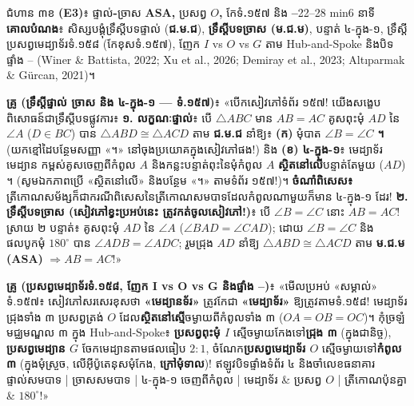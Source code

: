 \documentclass[a4paper,12pt]{article}
\newcommand{\en}[1]{{\TimesEn #1}}
\newcommand{\enbf}[1]{{\TimesEn\textbf{#1}}}
\newcommand{\cnum}[1]{{\TimesEn\fontsize{10.5pt}{12pt}\selectfont\ding{\numexpr181+#1\relax}}}
\newcommand{\tri}[1]{\ensuremath{\triangle #1}}
\newcommand{\ang}[1]{\ensuremath{\angle #1}}
\newcommand{\cg}{\ensuremath{\cong}}
\begin{document}
\Needspace{2.0cm}
\begin{phasebox}{ជំហាន ៣ខ \enbf{(E3)}៖ ផ្ទាល់\enbf{-}ច្រាស \enbf{ASA,} ប្រសព្វ $O$\enbf{,} កែទំ\enbf{.}១៥៧ និង \cnum{1}\enbf{--}\cnum{5}}{22--28 min}{6 នាទី}
\textbf{គោលបំណង}៖ សិស្សបង្គុំទ្រឹស្ដីបទផ្ទាល់ (\textbf{ជ.ម.ជ}), \textbf{ទ្រឹស្ដីបទច្រាស (\textbf{ម.ជ.ម})}, បន្ទាត់ ៤-ក្នុង-១, ទ្រឹស្ដីប្រសព្វមេដ្យាទ័រទំ.១៥៨ (កែខុសទំ.១៥៧), ញែក $I$ \en{vs} $O$ \en{vs} $G$ តាម \en{Hub-and-Spoke} និងបិទផ្ទាំង \cnum{1}--\cnum{5} \en{(Winer \& Battista, 2022; Xu et al., 2026; Demiray et al., 2023; Altıparmak \& Gürcan, 2021)}។
\end{phasebox}
\begin{scriptbox}
  \textbf{គ្រូ (ទ្រឹស្ដីផ្ទាល់ ច្រាស និង ៤-ក្នុង-១ — ទំ.១៥៧)}៖ «បើកសៀវភៅទំព័រ ១៥៧! យើងសង្ខេបពិសោធន៍ជាទ្រឹស្ដីបទផ្លូវការ៖ \textbf{១. លក្ខណៈផ្ទាល់}៖ បើ $\tri{ABC}$ មាន $AB=AC$ គូសពុះមុំ $AD$ នៃ $\ang{A}$ ($D\in BC$) បាន $\tri{ABD}\cg\tri{ACD}$ តាម \textbf{ជ.ម.ជ} នាំឱ្យ៖ \textbf{(ក)} មុំបាត $\ang{B}=\ang{C}$ \textbf{។} (យកខ្មៅដៃបន្ថែមសញ្ញា «។» នៅចុងប្រយោគក្នុងសៀវភៅផង!) និង \textbf{(ខ) ៤-ក្នុង-១}៖ មេដ្យាទ័រ មេដ្យាន កម្ពស់គូសចេញពីកំពូល $A$ និងកន្លះបន្ទាត់ពុះនៃមុំកំពូល $A$ \textbf{ស្ថិតនៅលើ}បន្ទាត់តែមួយ ($AD$) ។ (សូមឯកភាពប្រើ «ស្ថិតនៅលើ» និងបន្ថែម «។» តាមទំព័រ ១៥៧!)។ \textbf{ចំណាំពិសេស៖} ត្រីកោណសម័ង្សក៏ជាករណីពិសេសនៃត្រីកោណសមបាទដែលកំពូលណាមួយក៏មាន ៤-ក្នុង-១ ដែរ! \textbf{២. ទ្រឹស្ដីបទច្រាស (សៀវភៅខ្វះប្រអប់នេះ ត្រូវកត់ចូលសៀវភៅ!)}៖ បើ $\ang{B}=\ang{C}$ នោះ $AB=AC$! ស្រាយ ២ បន្ទាត់៖ គូសពុះមុំ $AD$ នៃ $\ang{A}$ ($\ang{BAD}=\ang{CAD}$); ដោយ $\ang{B}=\ang{C}$ និងផលបូកមុំ $180^\circ$ បាន $\ang{ADB}=\ang{ADC}$; រួមជ្រុង $AD$ នាំឱ្យ $\tri{ABD}\cg\tri{ACD}$ តាម \textbf{ម.ជ.ម (\en{ASA})} $\Rightarrow AB=AC$!»\par\vspace{2pt}
  \textbf{គ្រូ (ប្រសព្វមេដ្យាទ័រទំ.១៥៨, ញែក \en{I vs O vs G} និងផ្ទាំង \cnum{1}--\cnum{5})}៖ «មើលប្រអប់ «សម្គាល់» ទំ.១៥៧៖ សៀវភៅសរសេរខុសថា \textbf{«មេដ្យានទ័រ»} ត្រូវកែជា \textbf{«មេដ្យាទ័រ»} ឱ្យត្រូវតាមទំ.១៥៨! មេដ្យាទ័រជ្រុងទាំង ៣ ប្រសព្វត្រង់ $O$ ដែល\textbf{ស្ថិតនៅស្មើ}ចម្ងាយពីកំពូលទាំង ៣ ($OA=OB=OC$)។ កុំច្រឡំមជ្ឈមណ្ឌល ៣ ក្នុង \en{Hub-and-Spoke}៖ \textbf{ប្រសព្វពុះមុំ $I$} ស្មើចម្ងាយកែងទៅ\textbf{ជ្រុង ៣} (ក្នុងជានិច្ច), \textbf{ប្រសព្វមេដ្យាន $G$} ចែកមេដ្យានតាមផលធៀប $2:1$, ចំណែក\textbf{ប្រសព្វមេដ្យាទ័រ $O$} ស្មើចម្ងាយទៅ\textbf{កំពូល ៣} (ក្នុងមុំស្រួច, លើអ៊ីប៉ូតេនុសមុំកែង, \textbf{ក្រៅមុំទាល})! ឥឡូវបិទផ្ទាំងទំព័រ ៤ និងចាំលេខធនាគារ \cnum{1} ផ្ទាល់សមបាទ \en{|} \cnum{2} ច្រាសសមបាទ \en{|} \cnum{3} ៤-ក្នុង-១ ចេញពីកំពូល \en{|} \cnum{4} មេដ្យាទ័រ \& ប្រសព្វ $O$ \en{|} \cnum{5} ត្រីកោណប៉ុនគ្នា \& $180^\circ$!»
\end{scriptbox}
\end{document}
